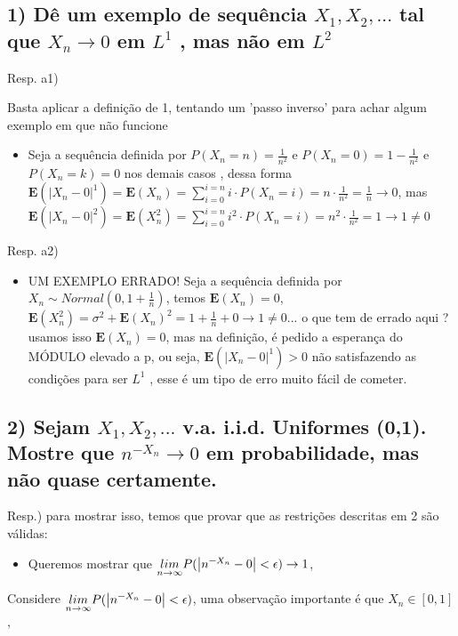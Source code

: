 \documentclass[english]{article}
\begin{document}
\subsection*{\textmd{1) Dê um exemplo de sequência $X_{1},X_{2},...$ tal que
$X_{n}\rightarrow0$ em $L^{1}$ , mas não em $L^{2}$}}

Resp. a1)

Basta aplicar a definição de 1, tentando um 'passo inverso' para achar
algum exemplo em que não funcione
\begin{itemize}
\item Seja a sequência definida por $P(X_{n}=n)=\frac{1}{n^{2}}$ e $P(X_{n}=0)=1-\frac{1}{n^{2}}$
e $P(X_{n}=k)=0$ nos demais casos , dessa forma $\mathbf{E}(\left|X_{n}-0\right|^{1})=\mathbf{E}(X_{n})=\sum_{i=0}^{i=n}i\cdot P(X_{n}=i)=n\cdot\frac{1}{n^{2}}=\frac{1}{n}\rightarrow0$,
mas $\mathbf{E}(\left|X_{n}-0\right|^{2})=\mathbf{E}(X_{n}^{2})=\sum_{i=0}^{i=n}i^{2}\cdot P(X_{n}=i)=n^{2}\cdot\frac{1}{n^{2}}=1\rightarrow1\neq0$
\end{itemize}
Resp. a2)
\begin{itemize}
\item UM EXEMPLO ERRADO! Seja a sequência definida por $X_{n}\sim Normal(0,1+\frac{1}{n})$,
temos $\mathbf{E}(X_{n})=0$, $\mathbf{E}(X_{n}^{2})=\sigma^{2}+\mathbf{E}(X_{n})^{2}=1+\frac{1}{n}+0\rightarrow1\neq0$...
o que tem de errado aqui ? usamos isso $\mathbf{E}(X_{n})=0$, mas
na definição, é pedido a esperança do MÓDULO elevado a p, ou seja,
$\mathbf{E}(\left|X_{n}-0\right|^{1})>0$ não satisfazendo as condições
para ser $L^{1}$ , esse é um tipo de erro muito fácil de cometer.
\end{itemize}

\subsection*{\textcompwordmark{}}


\subsection*{\textmd{2) Sejam $X_{1},X_{2},...$ v.a. i.i.d. Uniformes (0,1).
Mostre que $n^{-X_{n}}\rightarrow0$ em probabilidade, mas não quase
certamente.}}

Resp.) para mostrar isso, temos que provar que as restrições descritas
em 2 são válidas:
\begin{itemize}
\item Queremos mostrar que $\underset{n\rightarrow\infty}{lim}P(\left|n^{\text{\textminus}X_{n}}-0\right|<\epsilon)\rightarrow1$,
\end{itemize}
Considere $\underset{n\rightarrow\infty}{lim}P(\left|n^{\text{\textminus}X_{n}}-0\right|<\epsilon)$,
uma observação importante é que $X_{n}\in[0,1]$, 
\end{document}

